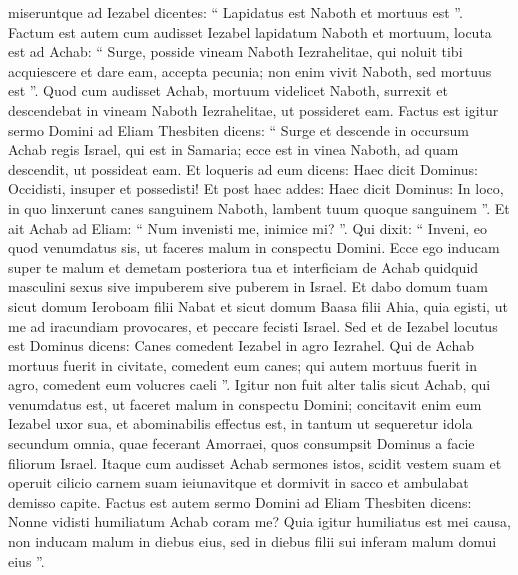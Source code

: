 \begin{biblechapter}
\begin{biblechapter}
\begin{biblechapter}
\begin{biblechapter}
\begin{biblechapter}
\begin{biblechapter}
\begin{biblechapter}
\begin{biblechapter}
\begin{biblechapter}
\begin{biblechapter}
\begin{biblechapter}
\begin{biblechapter}
\begin{biblechapter}
\begin{biblechapter}
\begin{biblechapter}
\begin{biblechapter}
\begin{biblechapter}
\begin{biblechapter}
\begin{biblechapter}
\begin{biblechapter}
\begin{biblechapter}
 \verse miseruntque ad Iezabel dicentes: “ Lapidatus est Naboth et mortuus est ”.
 \verse Factum est autem cum audisset Iezabel lapidatum Naboth et mortuum, locuta est ad Achab: “ Surge, posside vineam Naboth Iezrahelitae, qui noluit tibi acquiescere et dare eam, accepta pecunia; non enim vivit Naboth, sed mortuus est ”. 
\verse Quod cum audisset Achab, mortuum videlicet Naboth, surrexit et descendebat in vineam Naboth Iezrahelitae, ut possideret eam.
 \verse Factus est igitur sermo Domini ad Eliam Thesbiten dicens: 
\verse “ Surge et descende in occursum Achab regis Israel, qui est in Samaria; ecce est in vinea Naboth, ad quam descendit, ut possideat eam. 
\verse Et loqueris ad eum dicens: Haec dicit Dominus: Occidisti, insuper et possedisti! Et post haec addes: Haec dicit Dominus: In loco, in quo linxerunt canes sanguinem Naboth, lambent tuum quoque sanguinem ”. 
\verse Et ait Achab ad Eliam: “ Num invenisti me, inimice mi? ”. Qui dixit: “ Inveni, eo quod venumdatus sis, ut faceres malum in conspectu Domini. 
\verse Ecce ego inducam super te malum et demetam posteriora tua et interficiam de Achab quidquid masculini sexus sive impuberem sive puberem in Israel. 
\verse Et dabo domum tuam sicut domum Ieroboam filii Nabat et sicut domum Baasa filii Ahia, quia egisti, ut me ad iracundiam provocares, et peccare fecisti Israel. 
\verse Sed et de Iezabel locutus est Dominus dicens: Canes comedent Iezabel in agro Iezrahel. 
\verse Qui de Achab mortuus fuerit in civitate, comedent eum canes; qui autem mortuus fuerit in agro, comedent eum volucres caeli ”.
 \verse Igitur non fuit alter talis sicut Achab, qui venumdatus est, ut faceret malum in conspectu Domini; concitavit enim eum Iezabel uxor sua, 
\verse et abominabilis effectus est, in tantum ut sequeretur idola secundum omnia, quae fecerant Amorraei, quos consumpsit Dominus a facie filiorum Israel.
 \verse Itaque cum audisset Achab sermones istos, scidit vestem suam et operuit cilicio carnem suam ieiunavitque et dormivit in sacco et ambulabat demisso capite. 
\verse Factus est autem sermo Domini ad Eliam Thesbiten dicens: 
\verse Nonne vidisti humiliatum Achab coram me? Quia igitur humiliatus est mei causa, non inducam malum in diebus eius, sed in diebus filii sui inferam malum domui eius ”.
 

\end{biblechapter}
\end{biblechapter}
\end{biblechapter}
\end{biblechapter}
\end{biblechapter}
\end{biblechapter}
\end{biblechapter}
\end{biblechapter}
\end{biblechapter}
\end{biblechapter}
\end{biblechapter}
\end{biblechapter}
\end{biblechapter}
\end{biblechapter}
\end{biblechapter}
\end{biblechapter}
\end{biblechapter}
\end{biblechapter}
\end{biblechapter}
\end{biblechapter}
\end{biblechapter}
